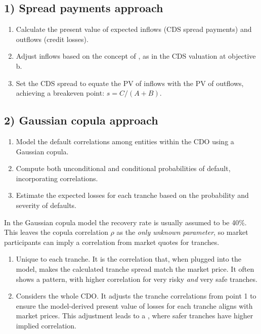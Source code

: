 \subsection*{1) Spread payments approach}

\begin{enumerate}[label=\alph*)]
\item Calculate the present value of expected inflows (CDS spread payments) and
outflows (credit losses).
\item Adjust inflows based on the concept of , as in the
CDS valuation at objective b.
\item Set the CDS spread to equate the PV of inflows with the PV of outflows,
achieving a breakeven point: $s = C/(A+B)$.
\end{enumerate}

\subsection*{2) Gaussian copula approach}

\begin{enumerate}[label=\alph*)]
\item Model the default correlations among entities within the CDO using a
Gaussian copula.
\item Compute both unconditional and conditional probabilities of default,
incorporating correlations.
\item Estimate the expected losses for each tranche based on the probability and
severity of defaults.
\end{enumerate}


In the Gaussian copula model the recovery rate is usually assumed to be 40\%.
This leaves the copula correlation $\rho$ as the \emph{only unknown parameter},
so market participants can imply a correlation from market quotes for tranches.

\begin{enumerate}
\item {} Unique to each tranche. It is the
correlation that, when plugged into the model, makes the calculated tranche spread
match the market price. It often shows a  pattern, with higher
correlation for very risky \emph{and} very safe tranches.
\item {} Considers the whole CDO. It adjusts the tranche
correlations from point 1 to ensure the model-derived present value of losses for
each tranche aligns with market prices. This adjustment leads to a ,
where safer tranches have higher implied correlation.
\end{enumerate}

